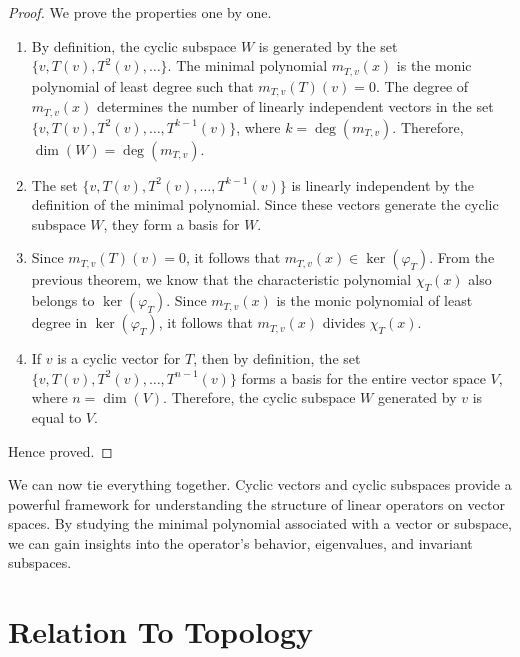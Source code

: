 \documentclass[openany]{book}
\begin{document}
\begin{proof}
We prove the properties one by one.
\begin{enumerate}
    \item By definition, the cyclic subspace $W$ is generated by the set $\{v, T(v), T^2(v), \ldots\}$. The minimal polynomial $m_{T,v}(x)$ is the monic polynomial of least degree such that $m_{T,v}(T)(v) = 0$. The degree of $m_{T,v}(x)$ determines the number of linearly independent vectors in the set $\{v, T(v), T^2(v), \ldots, T^{k-1}(v)\}$, where $k = \deg(m_{T,v})$. Therefore, $\dim(W) = \deg(m_{T,v})$.
    \item The set $\{v, T(v), T^2(v), \ldots, T^{k-1}(v)\}$ is linearly independent by the definition of the minimal polynomial. Since these vectors generate the cyclic subspace $W$, they form a basis for $W$.
    \item Since $m_{T,v}(T)(v) = 0$, it follows that $m_{T,v}(x) \in \ker(\varphi_T)$. From the previous theorem, we know that the characteristic polynomial $\chi_T(x)$ also belongs to $\ker(\varphi_T)$. Since $m_{T,v}(x)$ is the monic polynomial of least degree in $\ker(\varphi_T)$, it follows that $m_{T,v}(x)$ divides $\chi_T(x)$.
    \item If $v$ is a cyclic vector for $T$, then by definition, the set $\{v, T(v), T^2(v), \ldots, T^{n-1}(v)\}$ forms a basis for the entire vector space $V$, where $n = \dim(V)$. Therefore, the cyclic subspace $W$ generated by $v$ is equal to $V$.
\end{enumerate}
Hence proved.
\end{proof}
We can now tie everything together. Cyclic vectors and cyclic subspaces provide a powerful framework for understanding the structure of linear operators on vector spaces. By studying the minimal polynomial associated with a vector or subspace, we can gain insights into the operator's behavior, eigenvalues, and invariant subspaces. 
\chapter{Relation To Topology}
\end{document}
